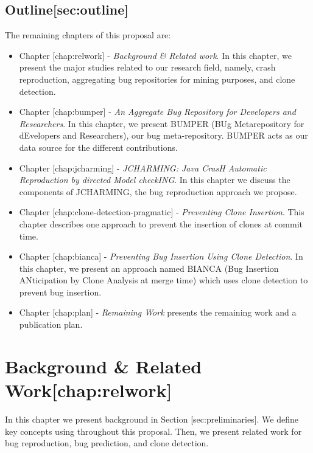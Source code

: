 \subsection{Outline{[}sec:outline{]}}\label{outlinesecoutline}

The remaining chapters of this proposal are:

\begin{itemize}
\item
  Chapter {[}chap:relwork{]} - {\emph{Background \& Related work}}. In
  this chapter, we present the major studies related to our research
  field, namely, crash reproduction, aggregating bug repositories for
  mining purposes, and clone detection.
\item
  Chapter {[}chap:bumper{]} - {\emph{An Aggregate Bug Repository for
  Developers and Researchers}}. In this chapter, we present {BUMPER}
  (BUg Metarepository for dEvelopers and Researchers), our bug
  meta-repository. {BUMPER} acts as our data source for the different
  contributions.
\item
  Chapter {[}chap:jcharming{]} - {\emph{JCHARMING: Java CrasH Automatic
  Reproduction by directed Model checkING}}. In this chapter we discuss
  the components of JCHARMING, the bug reproduction approach we propose.
\item
  Chapter {[}chap:clone-detection-pragmatic{]} - {\emph{Preventing Clone
  Insertion}}. This chapter describes one approach to prevent the
  insertion of clones at commit time.
\item
  Chapter {[}chap:bianca{]} - {\emph{Preventing Bug Insertion Using
  Clone Detection}}. In this chapter, we present an approach named
  {BIANCA} (Bug Insertion ANticipation by Clone Analysis at merge time)
  which uses clone detection to prevent bug insertion.
\item
  Chapter {[}chap:plan{]} - {\emph{Remaining Work}} presents the
  remaining work and a publication plan.
\end{itemize}

\section{Background \& Related
Work{[}chap:relwork{]}}\label{background-related-workchaprelwork}

In this chapter we present background in Section
{[}sec:preliminaries{]}. We define key concepts using throughout this
proposal. Then, we present related work for bug reproduction, bug
prediction, and clone detection.

